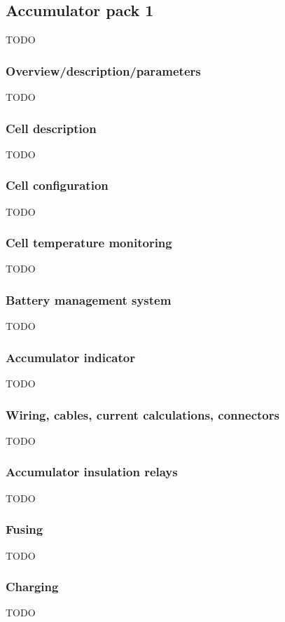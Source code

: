 \documentclass{article}
\begin{document}
\subsection{Accumulator pack 1}
TODO

\subsubsection{Overview/description/parameters}
TODO

\subsubsection{Cell description}
TODO

\subsubsection{Cell configuration}
TODO

\subsubsection{Cell temperature monitoring}
TODO

\subsubsection{Battery management system}
TODO

\subsubsection{Accumulator indicator}
TODO

\subsubsection{Wiring, cables, current calculations, connectors}
TODO

\subsubsection{Accumulator insulation relays}
TODO

\subsubsection{Fusing}
TODO

\subsubsection{Charging}
TODO
\end{document}
